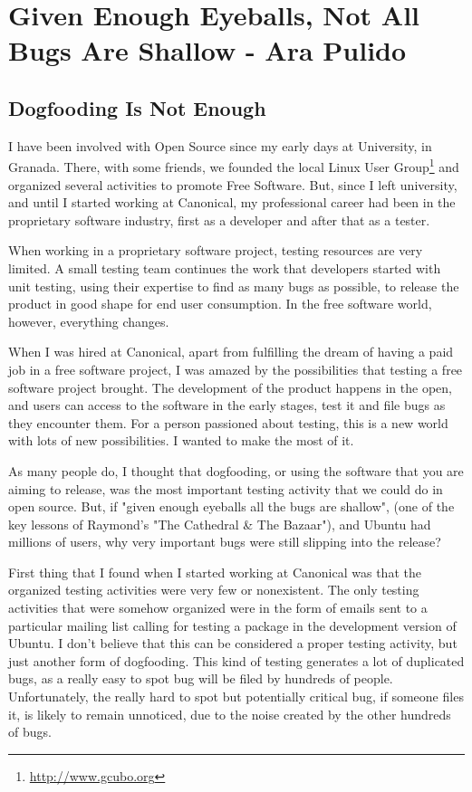 \chapter{Given Enough Eyeballs, Not All Bugs Are Shallow - Ara Pulido}
\section*{Dogfooding Is Not Enough} 

I have been involved with Open Source since my early days at University, in Granada. There, with some friends, we founded the local Linux User Group\footnote{\url{http://www.gcubo.org}} and organized several activities to promote Free Software. But, since I left university, and until I started working at Canonical, my professional career had been in the proprietary software industry, first as a developer and after that as a tester.

When working in a proprietary software project, testing resources are very limited. A small testing team continues the work that developers started with unit testing, using their expertise to find as many bugs as possible, to release the product in good shape for end user consumption. In the free software world, however, everything changes.

When I was hired at Canonical, apart from fulfilling the dream of having a paid job in a free software project, I was amazed by the possibilities that testing a free software project brought. The development of the product happens in the open, and users can access to the software in the early stages, test it and file bugs as they encounter them. For a person passioned about testing, this is a new world with lots of new possibilities. I wanted to make the most of it.

As many people do, I thought that dogfooding, or using the software that you are aiming to release, was the most important testing activity that we could do in open source. But, if "given enough eyeballs all the bugs are shallow", (one of the key lessons of Raymond's "The Cathedral \& The Bazaar"), and Ubuntu had millions of users, why very important bugs were still slipping into the release?

First thing that I found when I started working at Canonical was that the organized testing activities were very few or nonexistent. The only testing activities that were somehow organized were in the form of emails sent to a particular mailing list calling for testing a package in the development version of Ubuntu. I don't believe that this can be considered a proper testing activity, but just another form of dogfooding. This kind of testing generates a lot of duplicated bugs, as a really easy to spot bug will be filed by hundreds of people. Unfortunately, the really hard to spot but potentially critical bug, if someone files it, is likely to remain unnoticed, due to the noise created by the other hundreds of bugs.


